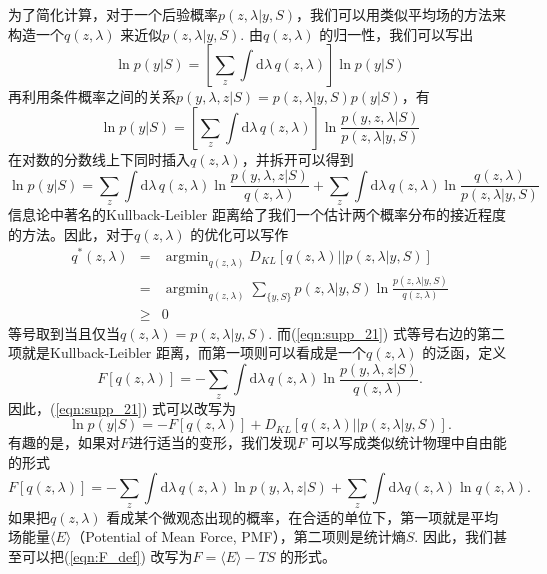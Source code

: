 \documentclass[11pt, a4paper]{article}
\DeclareMathOperator*{\argmin}{argmin}
\begin{document}
    为了简化计算，对于一个后验概率$p(z,\lambda|y, S)$，我们可以用类似平均场的方法来构造一个$q(z,\lambda)$ 来近似$p(z,\lambda|y, S)$. 由$q(z,\lambda)$ 的归一性，我们可以写出
    $$\ln p(y|S) = \left[\sum_z\int \mathrm d\lambda\, q(z,\lambda)\right]\ln p(y|S)$$
    再利用条件概率之间的关系$p(y,\lambda,z|S) = p(z,\lambda|y, S)p(y|S)$，有
    $$\ln p(y|S) = \left[\sum_z\int \mathrm d\lambda\, q(z,\lambda)\right]\ln \frac{p(y,z,\lambda|S)}{p(z,\lambda|y,S)}$$
    在对数的分数线上下同时插入$q(z,\lambda)$，并拆开可以得到
    \begin{equation}\label{eqn:supp_21}
      \ln p(y|S) = \sum_z\int \mathrm d\lambda\, q(z,\lambda)\ln\frac{p(y,\lambda,z|S)}{q(z,\lambda)}+\sum_z\int \mathrm d\lambda\, q(z,\lambda)\ln\frac{q(z,\lambda)}{p(z,\lambda|y,S)}
    \end{equation}
    信息论中著名的Kullback-Leibler 距离给了我们一个估计两个概率分布的接近程度的方法。因此，对于$q(z,\lambda)$ 的优化可以写作
    \begin{eqnarray*}
      q^*(z,\lambda) &=& \argmin_{q(z,\lambda)} D_{KL}[q(z,\lambda) || p(z,\lambda|y,S)] \\
                    &=& \argmin_{q(z,\lambda)}\sum_{\{y,S\}} p(z,\lambda|y,S)\ln\frac{p(z,\lambda|y,S)}{q(z,\lambda)}\\
                    &\ge& 0
    \end{eqnarray*}
    等号取到当且仅当$q(z,\lambda) = p(z,\lambda|y, S)$. 而(\ref{eqn:supp_21}) 式等号右边的第二项就是Kullback-Leibler 距离，而第一项则可以看成是一个$q(z,\lambda)$ 的泛函，定义
    \begin{equation}\label{eqn:F_def}
      F[q(z,\lambda)] = -\sum_z\int \mathrm d\lambda\, q(z,\lambda)\ln\frac{p(y,\lambda,z|S)}{q(z,\lambda)}.
    \end{equation}
    因此，(\ref{eqn:supp_21}) 式可以改写为
    \begin{equation}\label{eqn:supp_24}
      \ln p(y|S)= -F[q(z,\lambda)] +D_{KL}[q(z,\lambda)||p(z,\lambda| y, S)].
    \end{equation}
    有趣的是，如果对$F$进行适当的变形，我们发现$F$ 可以写成类似统计物理中自由能的形式
    \begin{equation}\label{eqn:supp_25}
	F[q(z,\lambda)] = -\sum_z\int \mathrm d\lambda\, q(z,\lambda)\ln p(y,\lambda,z|S) + \sum_z\int \mathrm d\lambda q(z,\lambda)\ln q(z,\lambda).
	\end{equation}
如果把$q(z,\lambda)$ 看成某个微观态出现的概率，在合适的单位下，第一项就是平均场能量$\langle E\rangle$（Potential of Mean Force, PMF），第二项则是统计熵$S$. 因此，我们甚至可以把(\ref{eqn:F_def}) 改写为$F=\langle E\rangle -TS$ 的形式。
\end{document}
